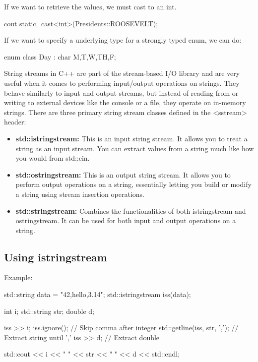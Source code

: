 \documentclass{report}
\begin{document}
    \bigbreak \noindent 
    If we want to retrieve the values, we must cast to an int.
    \bigbreak \noindent 
    
    \begin{cppcode}
cout static_cast<int>(Presidents::ROOSEVELT);
    \end{cppcode}
    
    \bigbreak \noindent 
    If we want to specify a underlying type for a strongly typed enum, we can do:
    \bigbreak \noindent 
    
    \begin{cppcode}
enum class Day : char {M,T,W,TH,F};
    \end{cppcode}
    


        \pagebreak
    \bigbreak \noindent 
     String streams in C++ are part of the stream-based I/O library and are very useful when it comes to performing input/output operations on strings. They behave similarly to input and output streams, but instead of reading from or writing to external devices like the console or a file, they operate on in-memory strings.
     \bigbreak \noindent 
     There are three primary string stream classes defined in the <sstream> header:
     \begin{itemize}
         \item \textbf{std::istringstream:} This is an input string stream. It allows you to treat a string as an input stream. You can extract values from a string much like how you would from std::cin.
         \item \textbf{std::ostringstream:} This is an output string stream. It allows you to perform output operations on a string, essentially letting you build or modify a string using stream insertion operations.
         \item \textbf{std::stringstream:} Combines the functionalities of both istringstream and ostringstream. It can be used for both input and output operations on a string.
     \end{itemize}

     \bigbreak \noindent 
     \subsection{Using istringstream}
     \bigbreak \noindent 
     Example:
     \bigbreak \noindent 
     
     \begin{cppcode}
std::string data = "42,hello,3.14";
std::istringstream iss(data);

int i;
std::string str;
double d;

iss >> i;
iss.ignore(); // Skip comma after integer
std::getline(iss, str, ','); // Extract string until ','
iss >> d;                    // Extract double

std::cout << i << " " << str << " " << d << std::endl;
     \end{cppcode}
     
\end{document}
